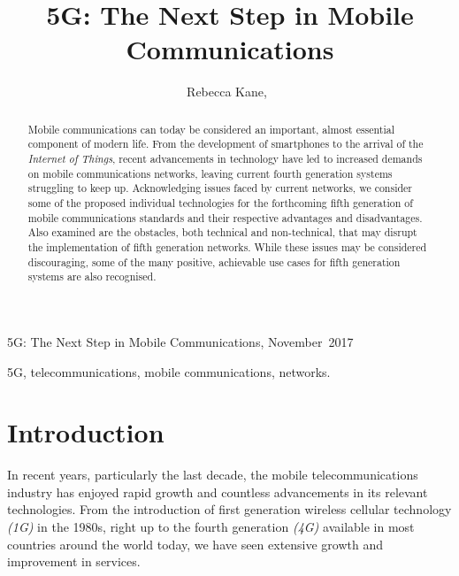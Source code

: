 \documentclass[journal]{IEEEtran}
\begin{document}
%
{5G: The Next Step in Mobile Communications, November~2017}

\title{5G: The Next Step in Mobile Communications}
\author{Rebecca Kane,~%
}

\maketitle

\begin{abstract}
Mobile communications can today be considered an important, almost essential component of modern life. From the development of smartphones to the arrival of the \textit{Internet of Things}, recent advancements in technology have led to increased demands on mobile communications networks, leaving current fourth generation systems struggling to keep up. Acknowledging issues faced by current networks, we consider some of the proposed individual technologies for the forthcoming fifth generation of mobile communications standards and their respective advantages and disadvantages. Also examined are the obstacles, both technical and non-technical, that may disrupt the implementation of fifth generation networks. While these issues may be considered discouraging, some of the many positive, achievable use cases for fifth generation systems are also recognised. 

\end{abstract}
\begin{IEEEkeywords}
5G, telecommunications, mobile communications, networks.
\end{IEEEkeywords}

\section{Introduction}
In recent years, particularly the last decade, the mobile telecommunications industry has enjoyed rapid growth and countless advancements in its relevant technologies. From the introduction of first generation wireless cellular technology \textit{(1G)} in the 1980s, right up to the fourth generation \textit{(4G)} available in most countries around the world today, we have seen extensive growth and improvement in services.
\end{document}
